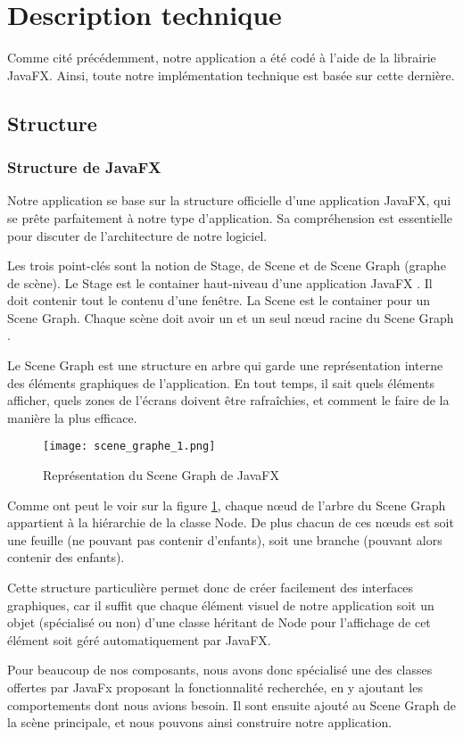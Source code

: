 \section{Description technique}

Comme cité précédemment, notre application a été codé à l'aide de la librairie JavaFX. Ainsi, toute notre implémentation technique est basée sur cette dernière. 

\subsection{Structure}
\subsubsection{Structure de JavaFX}
Notre application se base sur la structure officielle d'une application JavaFX, qui se prête parfaitement à notre type d'application. Sa compréhension est essentielle pour discuter de l'architecture de notre logiciel. 
\par
Les trois point-clés sont la notion de Stage, de Scene et de Scene Graph (graphe de scène). Le Stage est le container haut-niveau d'une application JavaFX \cite{javadoc_stage}. Il doit contenir tout le contenu d'une fenêtre. La Scene est le container pour un Scene Graph. Chaque scène doit avoir un et un seul nœud racine du Scene Graph \cite{javadoc_scene}.
\par
Le Scene Graph est une structure en arbre qui garde une représentation interne des éléments graphiques de l'application. En tout temps, il sait quels éléments afficher, quels zones de l'écrans doivent être rafraîchies, et comment le faire de la manière la plus efficace. 	
\begin{figure}[H]
	\caption{Représentation du Scene Graph de JavaFX}
	\centering
	\texttt{[image: scene\_graphe\_1.png]}
	\label{fig:scene_graphe_1}
\end{figure}
Comme ont peut le voir sur la figure \ref{fig:scene_graphe_1}, chaque nœud de l'arbre du Scene Graph appartient à la hiérarchie de la classe Node. De plus chacun de ces nœuds est soit une feuille (ne pouvant pas contenir d'enfants), soit une branche (pouvant alors contenir des enfants).
\par
Cette structure particulière permet donc de créer facilement des interfaces graphiques, car il suffit que chaque élément visuel de notre application soit un objet (spécialisé ou non) d'une classe héritant de Node pour l'affichage de cet élément soit géré automatiquement par JavaFX. 
\par 
Pour beaucoup de nos composants, nous avons donc spécialisé une des classes offertes par JavaFx proposant la fonctionnalité recherchée, en y ajoutant les comportements dont nous avions besoin. Il sont ensuite ajouté au Scene Graph de la scène principale, et nous pouvons ainsi construire notre application.


